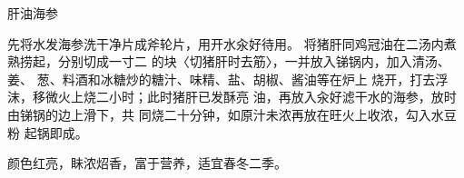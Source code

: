 \begin{recipe}{肝油海参}

\ingredients



\cooking

\step 先将水发海参洗干净片成斧轮片，用开水汆好待用。 将猪肝同鸡冠油在二汤内煮熟捞起，分别切成一寸二 的块〈切猪肝时去筋〉，一并放入锑锅内，加入清汤、姜、 葱、料酒和冰糖炒的糖汁、味精、盐、胡椒、酱油等在炉上 烧开，打去浮沫，移微火上烧二小时；此时猪肝已发酥亮 油，再放入汆好滤干水的海参，放时由锑锅的边上滑下，共 同烧二十分钟，如原汁未浓再放在旺火上收浓，勾入水豆粉 起锅即成。

\notes

颜色红亮，眛浓炤香，富于营养，适宜春冬二季。

\end{recipe}

